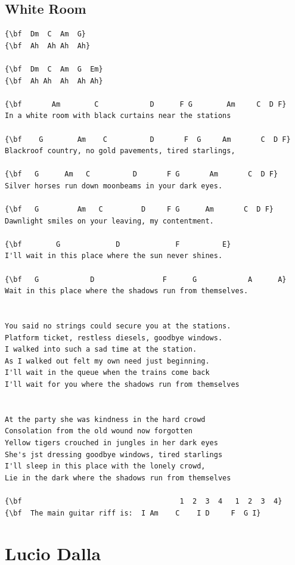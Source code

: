 \documentclass[a4paper]{article}
\begin{document}
\subsection{White Room}
\begin{Verbatim}[commandchars=\\\{\}]
{\bf  Dm  C  Am  G}
{\bf  Ah  Ah Ah  Ah}

{\bf  Dm  C  Am  G  Em}
{\bf  Ah Ah  Ah  Ah Ah}

{\bf       Am        C            D      F G        Am     C  D F}
In a white room with black curtains near the stations

{\bf    G        Am    C          D       F  G     Am       C  D F}
Blackroof country, no gold pavements, tired starlings,

{\bf   G      Am   C          D       F G       Am       C  D F}
Silver horses run down moonbeams in your dark eyes.

{\bf   G         Am   C         D     F G      Am       C  D F}
Dawnlight smiles on your leaving, my contentment.

{\bf        G             D             F          E}
I'll wait in this place where the sun never shines.

{\bf   G            D                F      G            A      A}
Wait in this place where the shadows run from themselves.


You said no strings could secure you at the stations.
Platform ticket, restless diesels, goodbye windows.
I walked into such a sad time at the station.
As I walked out felt my own need just beginning.
I'll wait in the queue when the trains come back
I'll wait for you where the shadows run from themselves


At the party she was kindness in the hard crowd
Consolation from the old wound now forgotten
Yellow tigers crouched in jungles in her dark eyes
She's jst dressing goodbye windows, tired starlings
I'll sleep in this place with the lonely crowd,
Lie in the dark where the shadows run from themselves

{\bf                                     1  2  3  4   1  2  3  4}
{\bf  The main guitar riff is:  I Am    C    I D     F  G I}

\end{Verbatim}
\newpage
\section{Lucio Dalla}
\end{document}
